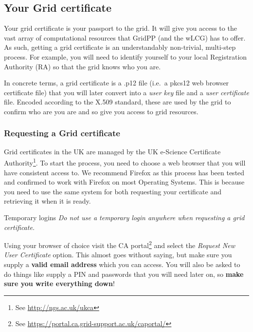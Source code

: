 \subsection{Your Grid certificate}
\label{sec:gridcert}
Your grid certificate is your passport to the grid. It will give you
access to the vast array of computational resources that GridPP (and the
wLCG) has to offer. As such, getting a grid certificate is an
understandably non-trivial, multi-step process. For example, you will
need to identify yourself to your local Registration Authority (RA) so
that the grid knows who you are.

In concrete terms, a grid certificate is a .p12 file (i.e.~a pkcs12 web
browser certificate file) that you will later convert into a \emph{user
key} file and a \emph{user certificate} file. Encoded according to the
X.509 standard, these are used by the grid to confirm who are you are
and so give you access to grid resources.

\subsubsection{Requesting a Grid certificate}
\label{requesting-a-grid-certificate}
Grid certificates in the UK are managed by the
UK e-Science Certificate Authority\footnote{%
See \href{http://ngs.ac.uk/ukca}{http://ngs.ac.uk/ukca}}.
To start the process, you need to choose a web browser that you will have
consistent access to. We recommend Firefox as this process has been
tested and confirmed to work with Firefox on most Operating Systems.
This is because you need to use the same system for both requesting your
certificate and retrieving it when it is ready.

\begin{warningbox}{Temporary logins}
\emph{Do not use a temporary login anywhere when requesting a grid
certificate.}
\end{warningbox}

Using your browser of choice visit the CA portal\footnote{%
See \href{https://portal.ca.grid-support.ac.uk/caportal/}{https://portal.ca.grid-support.ac.uk/caportal/}}
and select the \emph{Request New User Certificate} option. This almost goes
without saying, but make sure you supply a \textbf{valid email address}
which you can access. You will also be asked to do things like supply a
PIN and passwords that you will need later on, so \textbf{make sure you
write everything down}!

